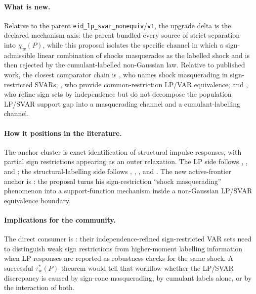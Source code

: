 \documentclass[11pt]{article}
\theoremstyle{definition}
\theoremstyle{plain}
\theoremstyle{remark}
\begin{document}
\paragraph{What is new.}
Relative to the parent \texttt{eid\_lp\_svar\_nonequiv}/\texttt{v1}, the upgrade delta is the declared mechanism axis: the parent bundled every source of strict separation into \(\chi_w(P)\), while this proposal isolates the specific channel in which a sign-admissible linear combination of shocks masquerades as the labelled shock and is then rejected by the cumulant-labelled non-Gaussian law.  Relative to published work, the closest comparator chain is \citet{Wolf2022}, who names shock masquerading in sign-restricted SVARs; \citet{PlagborgMollerWolf2021}, who provide common-restriction LP/VAR equivalence; and \citet{DrautzburgWright2023}, who refine sign sets by independence but do not decompose the population LP/SVAR support gap into a masquerading channel and a cumulant-labelling channel.

\paragraph{How it positions in the literature.}
The anchor cluster is exact identification of structural impulse responses, with partial sign restrictions appearing as an outer relaxation.  The LP side follows \citet{Jorda2005}, \citet{PlagborgMollerWolf2021}, and \citet{MontielOleaPlagborgMollerQianWolf2024}; the structural-labelling side follows \citet{GourierouxMonfortRenne2017}, \citet{LanneMeitzSaikkonen2017}, \citet{Guay2021}, and \citet{LanneLiuLuoto2026}.  The new active-frontier anchor is \citet{Wolf2022}: the proposal turns his sign-restriction ``shock masquerading'' phenomenon into a support-function mechanism inside a non-Gaussian LP/SVAR equivalence boundary.

\paragraph{Implications for the community.}
The direct consumer is \citet{DrautzburgWright2023}: their independence-refined sign-restricted VAR sets need to distinguish weak sign restrictions from higher-moment labelling information when LP responses are reported as robustness checks for the same shock.  A successful \(\tau_w^*(P)\) theorem would tell that workflow whether the LP/SVAR discrepancy is caused by sign-cone masquerading, by cumulant labels alone, or by the interaction of both.
\end{document}
